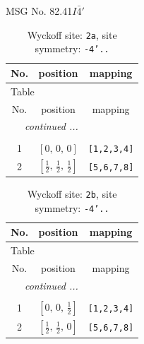 \documentclass[fleqn,8pt]{jsarticle}
\begin{document}
\setcounter{MaxMatrixCols}{32}

\renewcommand{\tablename}{Table~}
\renewcommand{\figurename}{Figure~}
\begin{center}
\LARGE
MSG No. 82.41\quad$I\bar{4}'$
\end{center}
\renewcommand{\arraystretch}{1.2}
\begin{longtable}{ccc}
\caption{Wyckoff site: {\tt 2a}, site symmetry: {\tt -4'..}}
 \\
 \hline \hline
No. & position & mapping \\ \hline \endfirsthead

\multicolumn{2}{l}{\tablename\ \thetable{}} \\
 \hline \hline
No. & position & mapping \\ \hline \endhead

 \hline \hline
\multicolumn{2}{r}{\footnotesize\it continued ...} \\ \endfoot

 \hline \hline
\multicolumn{2}{r}{} \\ \endlastfoot

1 & $\left[ 0,\, 0,\, 0 \right]$ & {\tt [1,2,3,4]} \\ \hline
2 & $\left[ \frac{1}{2},\, \frac{1}{2},\, \frac{1}{2} \right]$ & {\tt [5,6,7,8]} \\
\end{longtable}
\renewcommand{\arraystretch}{1.2}
\begin{longtable}{ccc}
\caption{Wyckoff site: {\tt 2b}, site symmetry: {\tt -4'..}}
 \\
 \hline \hline
No. & position & mapping \\ \hline \endfirsthead

\multicolumn{2}{l}{\tablename\ \thetable{}} \\
 \hline \hline
No. & position & mapping \\ \hline \endhead

 \hline \hline
\multicolumn{2}{r}{\footnotesize\it continued ...} \\ \endfoot

 \hline \hline
\multicolumn{2}{r}{} \\ \endlastfoot

1 & $\left[ 0,\, 0,\, \frac{1}{2} \right]$ & {\tt [1,2,3,4]} \\ \hline
2 & $\left[ \frac{1}{2},\, \frac{1}{2},\, 0 \right]$ & {\tt [5,6,7,8]} \\
\end{longtable}
\end{document}
